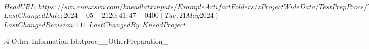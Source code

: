 \svnidlong
{$HeadURL: https://svn.riouxsvn.com/kneadlatxinputs/ExampleArtifactFolders/zProjectWideData/TestPrepProcs/TestPrep_OtherInformation.tex $}
{$LastChangedDate: 2024-05-21 20:41:47 -0400 (Tue, 21 May 2024) $}
{$LastChangedRevision: 111 $}
{$LastChangedBy: KneadProject $}

\TestProcedure  %
{\TestProcNumber.4}
{\StdTestNameX Other Information}
{lab:tproc_\StdTestName_OtherPreparation_\TestProcNumber}
{
}
{
}
{
}
